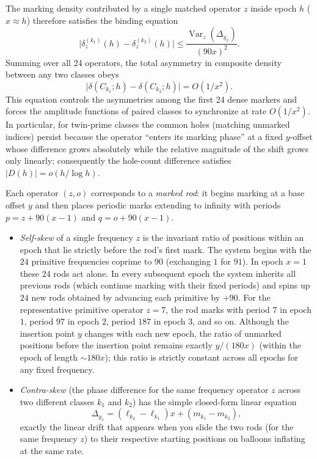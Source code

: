 \documentclass[11pt,a4paper]{article}
\begin{document}
The marking density contributed by a single matched operator \(z\) inside epoch \(h\) (\(x\approx h\)) therefore satisfies the binding equation
\[
\bigl|\delta_z^{(k_1)}(h)-\delta_z^{(k_2)}(h)\bigr|\le\frac{\operatorname{Var}_z(\Delta_{y_x})}{(90x)^2}.
\]
Summing over all 24 operators, the total asymmetry in composite density between any two classes obeys
\[
\bigl|\delta(C_{k_1};h)-\delta(C_{k_2};h)\bigr|=O(1/x^2).
\]
This equation controls the asymmetries among the first 24 dense markers and forces the amplitude functions of paired classes to synchronize at rate \(O(1/x^2)\). In particular, for twin-prime classes the common holes (matching unmarked indices) persist because the operator “enters its marking phase” at a fixed \(y\)-offset whose difference grows absolutely while the relative magnitude of the shift grows only linearly; consequently the hole-count difference satisfies \(|D(h)|=o(h/\log h)\).

Each operator \((z,o)\) corresponds to a \emph{marked rod}: it begins marking at a base offset \(y\) and then places periodic marks extending to infinity with periods \(p=z+90(x-1)\) and \(q=o+90(x-1)\).



\begin{itemize}
\item \emph{Self-skew} of a single frequency \(z\) is the invariant ratio of positions within an epoch that lie strictly before the rod’s first mark. The system begins with the $24$ primitive frequencies coprime to $90$ (exchanging $1$ for $91$). In epoch $x=1$ these $24$ rods act alone. In every subsequent epoch the system inherits all previous rods (which continue marking with their fixed periods) and spins up $24$ new rods obtained by advancing each primitive by $+90$. For the representative primitive operator $z=7$, the rod marks with period $7$ in epoch $1$, period $97$ in epoch $2$, period $187$ in epoch $3$, and so on. Although the insertion point $y$ changes with each new epoch, the ratio of unmarked positions before the insertion point remains exactly $y/(180x)$ (within the epoch of length \(\sim180x\)); this ratio is strictly constant across all epochs for any fixed frequency.
\item \emph{Contra-skew} (the phase difference for the same frequency operator \(z\) across two different classes \(k_1\) and \(k_2\)) has the simple closed-form linear equation
\[
\Delta_{y_x}=(\ell_{k_2}-\ell_{k_1})x+(m_{k_1}-m_{k_2}),
\]
exactly the linear drift that appears when you slide the two rods (for the same frequency \(z\)) to their respective starting positions on balloons inflating at the same rate.

\end{itemize}
\end{document}
